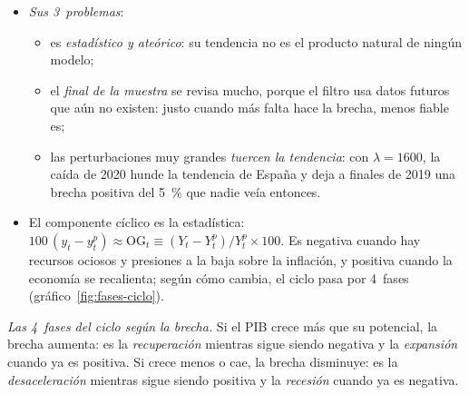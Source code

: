 \documentclass[11pt]{article}
\begin{document}
\begin{anotaciones}
\begin{figuracaja}
\end{figuracaja}
\begin{itemize}
\item \emph{Sus 3~problemas}\nocite{Hamilton2018Why,PhillipsJin2021HP}:
  \begin{itemize}
  \item es \emph{estadístico y ateórico}: su tendencia no es el producto natural de ningún modelo;
  \item el \emph{final de la muestra} se revisa mucho, porque el filtro usa datos futuros que aún no existen: justo cuando más falta hace la brecha, menos fiable es;
  \item las perturbaciones muy grandes \emph{tuercen la tendencia}: con $\lambda=1600$, la caída de 2020 hunde la tendencia de España y deja a finales de 2019 una brecha positiva del 5~\% que nadie veía entonces\nocite{Eurostat2026namq10gdp}.
  \end{itemize}
\end{itemize}
\end{anotaciones}

\begin{itemize}
\item El componente cíclico es la  estadística: $100\,(y_t-y^p_t)\approx\mathrm{OG}_t\equiv(Y_t-Y^p_t)/Y^p_t\times100$. Es negativa cuando hay recursos ociosos y presiones a la baja sobre la inflación, y positiva cuando la economía se recalienta; según cómo cambia, el ciclo pasa por 4~fases (gráfico~\ref{fig:fases-ciclo}).
\end{itemize}

\begin{anotaciones}
\emph{Las 4~fases del ciclo según la brecha.} Si el PIB crece más que su potencial, la brecha aumenta: es la \emph{recuperación} mientras sigue siendo negativa y la \emph{expansión} cuando ya es positiva. Si crece menos o cae, la brecha disminuye: es la \emph{desaceleración} mientras sigue siendo positiva y la \emph{recesión} cuando ya es negativa.
\begin{figuracaja}
\caption{Las 4~fases del ciclo según la brecha de producción}\label{fig:fases-ciclo}
\end{figuracaja}
\end{anotaciones}
\end{document}
